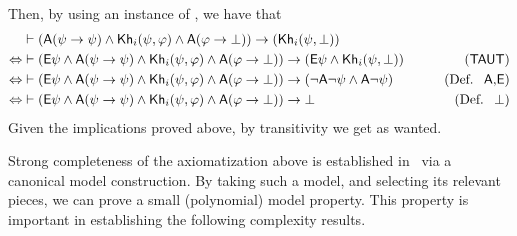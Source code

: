 %
Then, by using an instance of , we have that
\begin{align*}
    & \vdash (\A(\psi \ra \psi) \wedge \khi(\psi,\varphi) \wedge \A(\varphi \ra \bot)) \ra (\khi(\psi,\bot)) & \\
    \Leftrightarrow &  \vdash (\E\psi \wedge \A(\psi \ra \psi) \wedge \khi(\psi,\varphi) \wedge \A(\varphi \ra \bot)) \ra (\E\psi \wedge \khi(\psi,\bot)) & \tag{\axm{TAUT}} \\
    \Leftrightarrow & \vdash (\E\psi \wedge \A(\psi \ra \psi) \wedge \khi(\psi,\varphi) \wedge \A(\varphi \ra \bot)) \ra (\neg\A\neg\psi \wedge \A\neg\psi) & \tag{\mbox{Def. } \A,\E} \\
    \Leftrightarrow & \vdash (\E\psi \wedge \A(\psi \ra \psi) \wedge \khi(\psi,\varphi) \wedge \A(\varphi \ra \bot)) \ra \bot & \tag{\mbox{Def. } $\bot$} 
\end{align*}
%
%
Given the implications proved above, by transitivity we get  as wanted.


Strong completeness of the axiomatization above is established in~\cite{AFSVQ21,AFSVQ23report} via a canonical model construction. By taking such a model, and selecting its relevant pieces, we can prove a small (polynomial) model property. This property is important in establishing the following complexity results.

\medskip 

